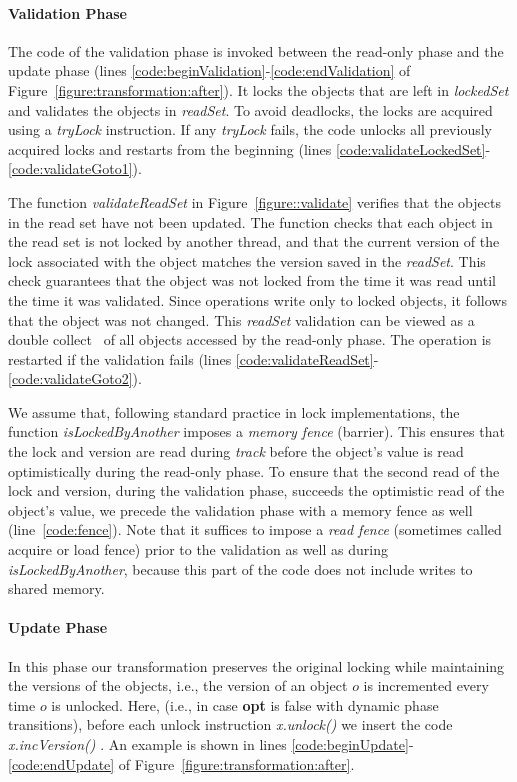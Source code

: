 \paragraph{Validation Phase}
The code of the validation phase is invoked between the read-only phase and the update phase (lines \ref{code:beginValidation}-\ref{code:endValidation} of Figure~\ref{figure:transformation:after}).
It locks the objects that are left in \emph{lockedSet} and validates the objects in \emph{readSet}.
To avoid deadlocks, the locks are acquired using a \emph{tryLock}
instruction.
If any \emph{tryLock} fails, the code unlocks  all
previously acquired locks and restarts from the beginning
(lines \ref{code:validateLockedSet}-\ref{code:validateGoto1}).

The function \emph{validateReadSet} in Figure~\ref{figure::validate} verifies that the objects in the read set have not been updated.
%
The function checks that each object in the read set is not locked by another thread,
and that the current version of the lock associated with the object matches the version saved in the
\emph{readSet}.
This check guarantees that the object was not locked from the time it was read until
the time it was validated.
Since operations write only to
locked objects, it follows that the object was not changed.
This \emph{readSet} validation can be viewed as a double collect~\cite{Afek:1993:ASS:153724.153741}
of all objects accessed by the read-only phase.
%
The operation is restarted if the validation fails (lines \ref{code:validateReadSet}-\ref{code:validateGoto2}).

We assume that, following standard practice in lock implementations, 
the function \textit{isLockedByAnother} imposes a \emph{memory fence} (barrier). 
This ensures that the lock and version are read during \textit{track} before the object's value is read optimistically
during the read-only phase. 
To ensure that the second read of the lock and version, during the validation phase, succeeds the 
optimistic read of the object's value, we precede the validation phase with a memory fence as well (line~\ref{code:fence}).  
Note that it suffices to impose a \emph{read fence} (sometimes called acquire or load fence) 
prior to the validation as well as during \textit{isLockedByAnother}, because this part of the code does not include
writes to shared memory.

\paragraph{Update Phase}
In this phase our transformation preserves the original locking while maintaining the versions of the objects, i.e., the version of an object $o$ is incremented every time $o$ is unlocked.
Here, (i.e., in case  \textbf{opt} is false with dynamic phase transitions), 
before each unlock instruction \emph{\ttfamily x.unlock()} we insert the code \emph{\ttfamily x.incVersion()} .
An example is shown in lines \ref{code:beginUpdate}-\ref{code:endUpdate} of Figure~\ref{figure:transformation:after}.


